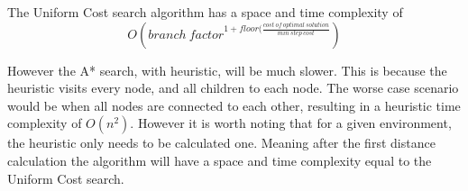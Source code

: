 \documentclass[12pt]{article}
\begin{document}
    The Uniform Cost search algorithm has a space and time complexity of $$O(branch\ factor^{1 + floor(\frac{cost\ of\ optimal\ solution}{min\ step\ cost}})$$

    However the A* search, with heuristic, will be much slower. This is because the heuristic visits every node, and all children to each node. The worse case scenario would be when all nodes are connected to each other, resulting in a heuristic time complexity of $O(n^2)$. However it is worth noting that for a given environment, the heuristic only needs to be calculated one. Meaning after the first distance calculation the algorithm will have a space and time complexity equal to the Uniform Cost search.
\end{document}
